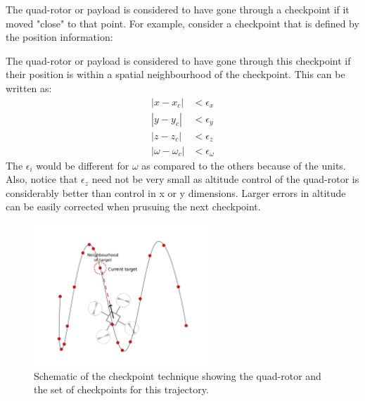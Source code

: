 \documentclass[hidelinks,BTech]{iitmdiss}
\begin{document}
The quad-rotor or payload is considered to have gone through a checkpoint if it moved "close" to that point. For example, consider a checkpoint that is defined by the position information:
\begin{equation}
  [x_c, y_c, z_y, \omega_c]
\end{equation}

The quad-rotor or payload is considered to have gone through this checkpoint if their position is within a spatial neighbourhood of the checkpoint. This can be written as:
\begin{equation} \begin{split}
  |x - x_c| &< \epsilon_x \\
  |y - y_c| &< \epsilon_y \\
  |z - z_c| &< \epsilon_z \\
  |\omega - \omega_c| &< \epsilon_\omega
\end{split} \end{equation}
The $\epsilon_i$ would be different for $\omega$ as compared to the others because of the units. Also, notice that $\epsilon_z$ need not be very small as altitude control of the quad-rotor is considerably better than control in x or y dimensions. Larger errors in altitude can be easily corrected when prusuing the next checkpoint.

\begin{figure}[H]
  \centering
    \includegraphics[width=0.6\textwidth]{checkpoint.png}
    \caption{Schematic of the checkpoint technique showing the quad-rotor and the set of checkpoints for this trajectory.}
\end{figure}
\end{document}

